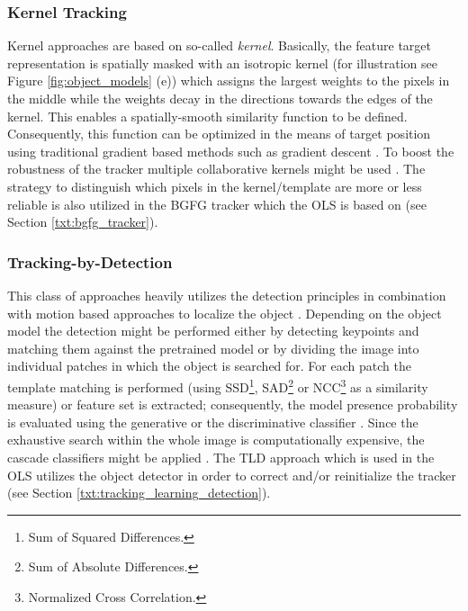 \subsubsection*{Kernel Tracking}
Kernel approaches are based on so-called \textit{kernel}. Basically, the feature target representation is spatially masked with an isotropic kernel (for illustration see Figure \ref{fig:object_models} (e)) which assigns the largest weights to the pixels in the middle while the weights decay in the directions towards the edges of the kernel. This enables a spatially-smooth similarity function to be defined. Consequently, this function can be optimized in the means of target position using traditional gradient based methods such as gradient descent \cite{Comaniciu:2003:KOT:776753.776799}. To boost the robustness of the tracker multiple collaborative kernels might be used \cite{MultipleCollaborativeKernelTracking, Multi-kernelCorrelationFilterForVisualTracking}. The strategy to distinguish which pixels in the kernel/template are more or less reliable is also utilized in the BGFG tracker which the OLS is based on (see Section \ref{txt:bgfg_tracker}).

\subsubsection*{Tracking-by-Detection}
This class of approaches heavily utilizes the detection principles in combination with motion based approaches to localize the object \cite{eth_biwi_00633, Kalal:2012:TRA:2225045.2225082}. Depending on the object model the detection might be performed either by detecting keypoints and matching them against the pretrained model \cite{FastKeypointRecognitionInTenLinesOfCode, DBLP:journals/corr/abs-1211-5829} or by dividing the image into individual patches in which the object is searched for. For each patch the template matching is performed \cite{AFastTemplateMatchingAlgorithm, ObjectTrackinginMonochromaticVideo} (using SSD\footnote{Sum of Squared Differences.}, SAD\footnote{Sum of Absolute Differences.} or NCC\footnote{Normalized Cross Correlation.} as a similarity measure) or feature set is extracted; consequently, the model presence probability is evaluated using the generative or the discriminative classifier \cite{EnhancedGaussianMixtureModels, EfficientScan-windowGPGPU}. Since the exhaustive search within the whole image is computationally expensive, the cascade classifiers might be applied \cite{violaJones, RobustObjectDetectionViaSoftCascade}. The TLD approach which is used in the OLS utilizes the object detector in order to correct and/or reinitialize the tracker (see Section \ref{txt:tracking_learning_detection}).

